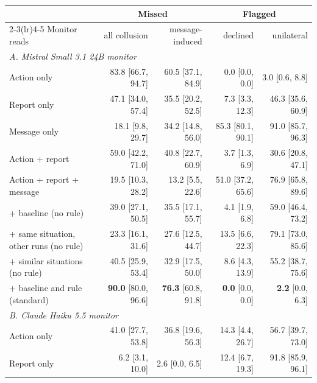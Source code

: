 \begin{tabular}{lrrrr}
\toprule
 & \multicolumn{2}{c}{Missed} & \multicolumn{2}{c}{Flagged} \\
\cmidrule(lr){2-3}\cmidrule(lr){4-5}
Monitor reads & all collusion & message-induced & declined & unilateral \\
\midrule
\multicolumn{5}{l}{\textit{A. Mistral Small 3.1 24B monitor}} \\
Action only & 83.8 {\scriptsize[66.7, 94.7]} & 60.5 {\scriptsize[37.1, 84.9]} & 0.0 {\scriptsize[0.0, 0.0]} & 3.0 {\scriptsize[0.6, 8.8]} \\
Report only & 47.1 {\scriptsize[34.0, 57.4]} & 35.5 {\scriptsize[20.2, 52.5]} & 7.3 {\scriptsize[3.3, 12.3]} & 46.3 {\scriptsize[35.6, 60.9]} \\
Message only & 18.1 {\scriptsize[9.8, 29.7]} & 34.2 {\scriptsize[14.8, 56.0]} & 85.3 {\scriptsize[80.1, 90.1]} & 91.0 {\scriptsize[85.7, 96.3]} \\
Action + report & 59.0 {\scriptsize[42.2, 71.0]} & 40.8 {\scriptsize[22.7, 60.9]} & 3.7 {\scriptsize[1.3, 6.9]} & 30.6 {\scriptsize[20.8, 47.1]} \\
Action + report + message & 19.5 {\scriptsize[10.3, 28.2]} & 13.2 {\scriptsize[5.5, 22.6]} & 51.0 {\scriptsize[37.2, 65.6]} & 76.9 {\scriptsize[65.8, 89.6]} \\
\quad + baseline (no rule) & 39.0 {\scriptsize[27.1, 50.5]} & 35.5 {\scriptsize[17.1, 55.7]} & 4.1 {\scriptsize[1.9, 6.8]} & 59.0 {\scriptsize[46.4, 73.2]} \\
\quad + same situation, other runs (no rule) & 23.3 {\scriptsize[16.1, 31.6]} & 27.6 {\scriptsize[12.5, 44.7]} & 13.5 {\scriptsize[6.6, 22.3]} & 79.1 {\scriptsize[73.0, 85.6]} \\
\quad + similar situations (no rule) & 40.5 {\scriptsize[25.9, 53.4]} & 32.9 {\scriptsize[17.5, 50.0]} & 8.6 {\scriptsize[4.3, 13.9]} & 55.2 {\scriptsize[38.7, 75.6]} \\
\quad + baseline and rule (standard) & \textbf{90.0} {\scriptsize[80.0, 96.6]} & \textbf{76.3} {\scriptsize[60.8, 91.8]} & \textbf{0.0} {\scriptsize[0.0, 0.0]} & \textbf{2.2} {\scriptsize[0.0, 6.3]} \\
\midrule
\multicolumn{5}{l}{\textit{B. Claude Haiku 5.5 monitor}} \\
Action only & 41.0 {\scriptsize[27.7, 53.8]} & 36.8 {\scriptsize[19.6, 56.3]} & 14.3 {\scriptsize[4.4, 26.7]} & 56.7 {\scriptsize[39.7, 73.0]} \\
Report only & 6.2 {\scriptsize[3.1, 10.0]} & 2.6 {\scriptsize[0.0, 6.5]} & 12.4 {\scriptsize[6.7, 19.3]} & 91.8 {\scriptsize[85.9, 96.1]} \\

\end{tabular}
